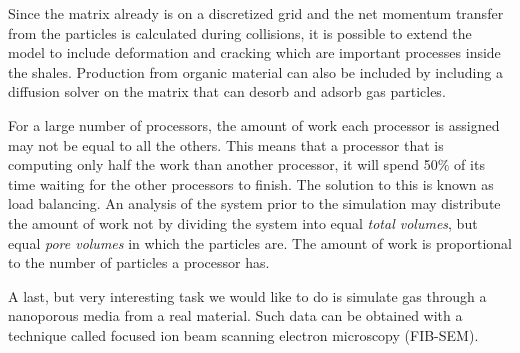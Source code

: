 Since the matrix already is on a discretized grid and the net momentum transfer from the particles is calculated during collisions, it is possible to extend the model to include deformation and cracking which are important processes inside the shales. Production from organic material can also be included by including a diffusion solver on the matrix that can desorb and adsorb gas particles.

For a large number of processors, the amount of work each processor is assigned may not be equal to all the others. This means that a processor that is computing only half the work than another processor, it will spend 50$\%$ of its time waiting for the other processors to finish. The solution to this is known as load balancing. An analysis of the system prior to the simulation may distribute the amount of work not by dividing the system into equal \textit{total volumes}, but equal \textit{pore volumes} in which the particles are. The amount of work is proportional to the number of particles a processor has.

A last, but very interesting task we would like to do is simulate gas through a nanoporous media from a real material. Such data can be obtained with a technique called focused ion beam scanning electron microscopy (FIB-SEM).